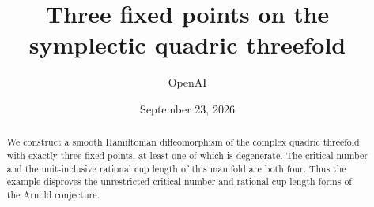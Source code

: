 \documentclass[11pt]{article}
\title{Three fixed points on the symplectic quadric threefold}
\author{OpenAI}
\date{September 23, 2026}
\theoremstyle{remark}
\numberwithin{equation}{section}
\begin{document}
\maketitle
\begin{abstract}
We construct a smooth Hamiltonian diffeomorphism of the complex quadric
threefold with exactly three fixed points, at least one of which is
degenerate. The critical number and the unit-inclusive rational cup length
of this manifold are both four. Thus the example disproves the unrestricted
critical-number and rational cup-length forms of the Arnold conjecture.
\end{abstract}







\end{document}
